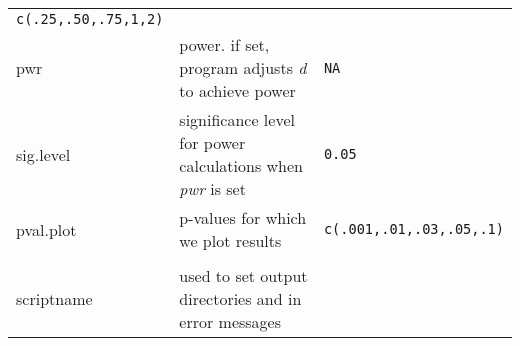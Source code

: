 \documentclass[]{article}
\begin{document}
\begin{longtable}[]{@{}lll@{}}
\begin{minipage}[t]{0.18\columnwidth}
\texttt{c(.25,.50,.75,1,2)}\strut
\end{minipage}\tabularnewline
\begin{minipage}[t]{0.18\columnwidth}\raggedright\strut
pwr\strut
\end{minipage} & \begin{minipage}[t]{0.56\columnwidth}\raggedright\strut
power. if set, program adjusts \emph{d} to achieve power\strut
\end{minipage} & \begin{minipage}[t]{0.18\columnwidth}\raggedright\strut
\texttt{NA}\strut
\end{minipage}\tabularnewline
\begin{minipage}[t]{0.18\columnwidth}\raggedright\strut
sig.level\strut
\end{minipage} & \begin{minipage}[t]{0.56\columnwidth}\raggedright\strut
significance level for power calculations when \emph{pwr} is set\strut
\end{minipage} & \begin{minipage}[t]{0.18\columnwidth}\raggedright\strut
\texttt{0.05}\strut
\end{minipage}\tabularnewline
\begin{minipage}[t]{0.18\columnwidth}\raggedright\strut
pval.plot\strut
\end{minipage} & \begin{minipage}[t]{0.56\columnwidth}\raggedright\strut
p-values for which we plot results\strut
\end{minipage} & \begin{minipage}[t]{0.18\columnwidth}\raggedright\strut
\texttt{c(.001,.01,.03,.05,.1)}\strut
\end{minipage}\tabularnewline
\begin{minipage}[t]{0.18\columnwidth}\raggedright\strut
\strut
\end{minipage} & \begin{minipage}[t]{0.56\columnwidth}\raggedright\strut
\strut
\end{minipage} & \begin{minipage}[t]{0.18\columnwidth}\raggedright\strut
\strut
\end{minipage}\tabularnewline
\begin{minipage}[t]{0.18\columnwidth}\raggedright\strut
scriptname\strut
\end{minipage} & \begin{minipage}[t]{0.56\columnwidth}\raggedright\strut
used to set output directories and in error messages\strut

\end{minipage}
\end{longtable}
\end{document}
